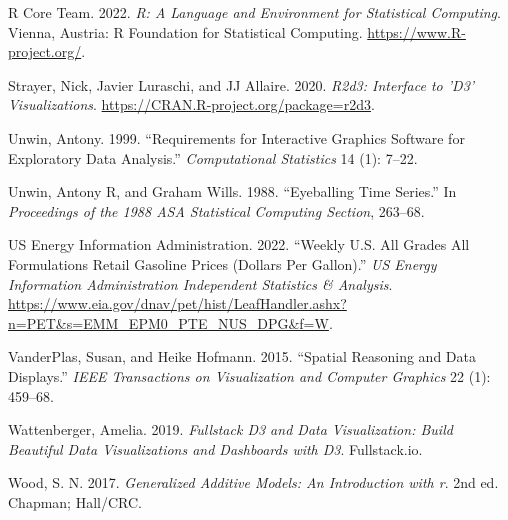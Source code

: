 \documentclass[
]{jds}
\newlength{\cslhangindent}
\newlength{\cslentryspacingunit} %
\newenvironment{CSLReferences}[2] %
 {%
  \setlength{\parindent}{0pt}
  \ifodd #1
  \let\oldpar\par
  \def\par{\hangindent=\cslhangindent\oldpar}
  \fi
  \setlength{\parskip}{#2\cslentryspacingunit}
 }%
 {}
\begin{document}
\begin{CSLReferences}{1}{0}
\leavevmode{}%
R Core Team. 2022. \emph{R: A Language and Environment for Statistical
Computing}. Vienna, Austria: R Foundation for Statistical Computing.
\url{https://www.R-project.org/}.

\leavevmode{}%
Strayer, Nick, Javier Luraschi, and JJ Allaire. 2020. \emph{R2d3:
Interface to 'D3' Visualizations}.
\url{https://CRAN.R-project.org/package=r2d3}.

\leavevmode{}%
Unwin, Antony. 1999. {``Requirements for Interactive Graphics Software
for Exploratory Data Analysis.''} \emph{Computational Statistics} 14
(1): 7--22.

\leavevmode{}%
Unwin, Antony R, and Graham Wills. 1988. {``Eyeballing Time Series.''}
In \emph{Proceedings of the 1988 ASA Statistical Computing Section},
263--68.

\leavevmode{}%
US Energy Information Administration. 2022. {``Weekly {U}.{S}. {All}
{Grades} {All} {Formulations} {Retail} {Gasoline} {Prices} ({Dollars}
Per {Gallon}).''} \emph{US Energy Information Administration Independent
Statistics \& Analysis}.
\url{https://www.eia.gov/dnav/pet/hist/LeafHandler.ashx?n=PET\&s=EMM_EPM0_PTE_NUS_DPG\&f=W}.

\leavevmode{}%
VanderPlas, Susan, and Heike Hofmann. 2015. {``Spatial Reasoning and
Data Displays.''} \emph{IEEE Transactions on Visualization and Computer
Graphics} 22 (1): 459--68.

\leavevmode{}%
Wattenberger, Amelia. 2019. \emph{Fullstack D3 and Data Visualization:
Build Beautiful Data Visualizations and Dashboards with D3}.
Fullstack.io.

\leavevmode{}%
Wood, S. N. 2017. \emph{Generalized Additive Models: An Introduction
with r}. 2nd ed. Chapman; Hall/CRC.

\end{CSLReferences}
\end{document}
